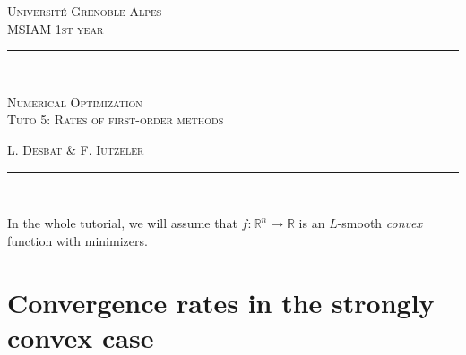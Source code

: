 \documentclass[a4paper,twoside,10pt]{amsart}
\numberwithin{equation}{section} %
\numberwithin{figure}{section} %
\numberwithin{table}{section} %
\newcommand{\horrule}[1]{\rule{\linewidth}{#1}} %
\theoremstyle{definition}
\begin{document}


\normalfont \normalsize 
\noindent\textsc{\small Universit\'e Grenoble Alpes  }\\
\noindent\textsc{\small  MSIAM 1st year} \\ [0.3cm] %
\horrule{0.5pt} \\[0.4cm] %
\begin{center}
{\LARGE \scshape  Numerical Optimization \\ Tuto 5: Rates of first-order methods} \\ %
\end{center}
\noindent\textsc{\hfill L. Desbat \& F. Iutzeler } 
\horrule{2pt} \\[0.5cm] %



\setcounter{section}{0}
\renewcommand{\thesection}{\Alph{section}} 
\renewcommand*{\theHsection}{TD.\the\value{section}}


\vspace*{0.5cm}

In the whole tutorial, we will assume that $f: \mathbb{R}^n\to \mathbb{R}$ is an $L$-smooth \emph{convex} function with minimizers.

\section{Convergence rates in the strongly convex case}
\vspace*{0.5cm}
\end{document}
